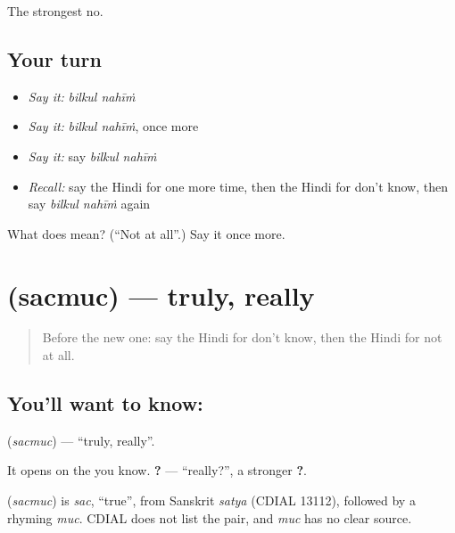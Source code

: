 \begin{grammarlens}[title={What you've built}]
The strongest no.
\end{grammarlens}

\subsection*{Your turn}
\begin{itemize}
\raggedright
  \item \emph{Say it:} \emph{bilkul nahīṁ}
  \item \emph{Say it:} \emph{bilkul nahīṁ}, once more
  \item \emph{Say it:} say \emph{bilkul nahīṁ}
  \item \emph{Recall:} say the Hindi for one more time, then the Hindi for don't know, then say \emph{bilkul nahīṁ} again
\end{itemize}

\begin{tcolorbox}[breakable,colback=teal!4,colframe=teal!35!black,title={Before you move on}]
What does   mean? (\textquotedblleft{}Not at all\textquotedblright{}.) Say it once more.
\end{tcolorbox}
\section[\texorpdfstring{\hi{सचमुच} (sacmuc)}{सचमुच (sacmuc)}]{ (sacmuc) — truly, really}

\label{lesson:HI-C127-sachmuch}



\begin{quote}
Before the new one: say the Hindi for don't know, then the Hindi for not at all.
\end{quote}

\subsection*{You'll want to know: }
\textbf{} (\emph{sacmuc}) — \textquotedblleft{}truly, really\textquotedblright{}.

It opens on the \textbf{} you know. \textbf{?} — \textquotedblleft{}really?\textquotedblright{}, a stronger \textbf{ ?}.

\begin{cousinweb}
\textbf{} (\emph{sacmuc}) is \emph{sac}, \textquotedblleft{}true\textquotedblright{}, from Sanskrit \emph{satya} (CDIAL 13112), followed by a rhyming \emph{muc}. CDIAL does not list the pair, and \emph{muc} has no clear source.
\end{cousinweb}

